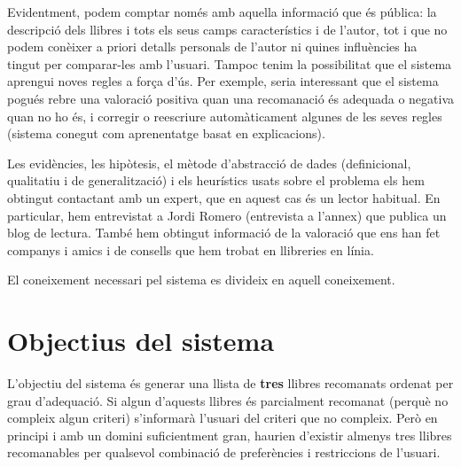 Evidentment, podem comptar només amb aquella informació que és pública: la descripció dels llibres i tots els seus camps característics i de l'autor, tot i que no podem conèixer a priori detalls personals de l'autor ni quines influències ha tingut per comparar-les amb l'usuari. Tampoc tenim la possibilitat que el sistema aprengui noves regles a força d'ús. Per exemple, seria interessant que el sistema pogués rebre una valoració positiva quan una recomanació és adequada o negativa quan no ho és, i corregir o reescriure automàticament algunes de les seves regles (sistema conegut com aprenentatge basat en explicacions).

Les evidències, les hipòtesis, el mètode d'abstracció de dades (definicional, qualitatiu i de generalització) i els heurístics usats sobre el problema els hem obtingut contactant amb un expert, que en aquest cas és un lector habitual. En particular, hem entrevistat a Jordi Romero (entrevista a l'annex) que publica un blog de lectura. També hem obtingut informació de la valoració que ens han fet companys i amics i de consells que hem trobat en llibreries en línia.

El coneixement necessari pel sistema es divideix en aquell coneixement.


\section{Objectius del sistema}

L'objectiu del sistema és generar una llista de \textbf{tres} llibres recomanats ordenat per grau d'adequació. Si algun d'aquests llibres és parcialment recomanat (perquè no compleix algun criteri) s'informarà l'usuari del criteri que no compleix. Però en principi i amb un domini suficientment gran, haurien d'existir almenys tres llibres recomanables per qualsevol combinació de preferències i restriccions de l'usuari.





